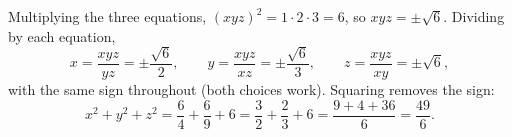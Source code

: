 Multiplying the three equations, $(xyz)^2=1\cdot2\cdot3=6$, so $xyz=\pm\sqrt6$. Dividing by each equation,
\[x=\dfrac{xyz}{yz}=\pm\dfrac{\sqrt6}{2},\qquad y=\dfrac{xyz}{xz}=\pm\dfrac{\sqrt6}{3},\qquad z=\dfrac{xyz}{xy}=\pm\sqrt6,\]
with the same sign throughout (both choices work). Squaring removes the sign:
\[x^2+y^2+z^2=\dfrac{6}{4}+\dfrac{6}{9}+6=\dfrac{3}{2}+\dfrac{2}{3}+6=\dfrac{9+4+36}{6}=\boxed{\dfrac{49}{6}}.\]
